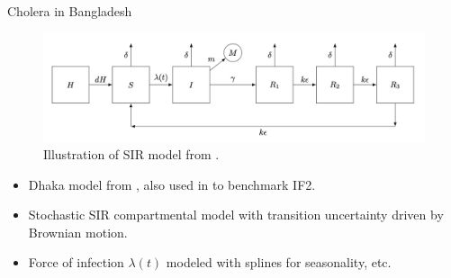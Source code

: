 \documentclass{beamer}
\begin{document}
\begin{frame}{Cholera in Bangladesh}

    \begin{figure}
        \centering
        \includegraphics[scale=0.5]{imgs/dacca.png}
        \caption{Illustration of SIR model from \cite{king08}.}
        \label{fig:sir}
    \end{figure}
    
    \begin{itemize}
        \item Dhaka model from \cite{king08}, also used in \cite{ionides15} to benchmark IF2.
        \item \pause Stochastic SIR compartmental model with transition uncertainty driven by Brownian motion.
        \item \pause Force of infection $\lambda(t)$ modeled with splines for seasonality, etc.
    \end{itemize}
    
\end{frame}
\end{document}
